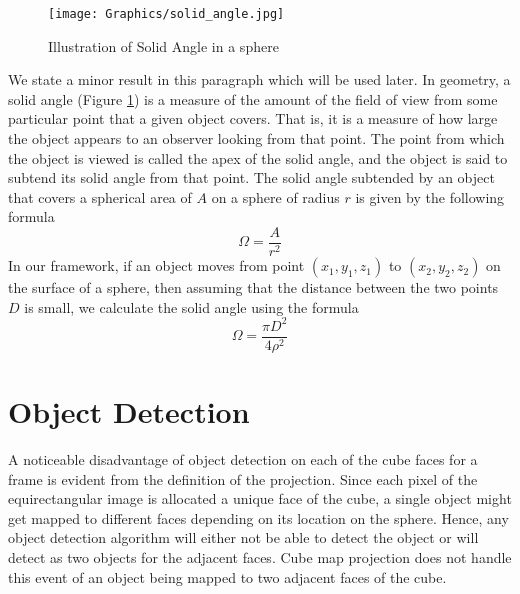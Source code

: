 \begin{figure}[h]
    \centering
    \texttt{[image: Graphics/solid\_angle.jpg]}
    \caption{Illustration of Solid Angle in a sphere}
    \label{fig:solid_angle}
\end{figure}
\par
We state a minor result in this paragraph which will be used later. In geometry, a solid angle (Figure \ref{fig:solid_angle}) is a measure of the amount of the field of view from some particular point that a given object covers. That is, it is a measure of how large the object appears to an observer looking from that point. The point from which the object is viewed is called the apex of the solid angle, and the object is said to subtend its solid angle from that point. The solid angle subtended by an object that covers a spherical area of \(A\) on a sphere of radius \(r\) is given by the following formula
\begin{equation}
    \Omega = \frac{A}{r^2}
\end{equation}
In our framework, if an object moves from point \((x_1, y_1, z_1)\) to \((x_2, y_2, z_2)\) on the surface of a sphere, then assuming that the distance between the two points \(D\) is small, we calculate the solid angle using the formula
\begin{equation}
    \Omega = \frac{\pi D^2}{4\rho^2}
\label{eq: solid_angle}    
\end{equation}


\section{Object Detection}
A noticeable disadvantage of object detection on each of the cube faces for a frame is evident from the definition of the projection. Since each pixel of the equirectangular image is allocated a unique face of the cube, a single object might get mapped to different faces depending on its location on the sphere. Hence, any object detection algorithm will either not be able to detect the object or will detect as two objects for the adjacent faces. Cube map projection does not handle this event of an object being mapped to two adjacent faces of the cube.

